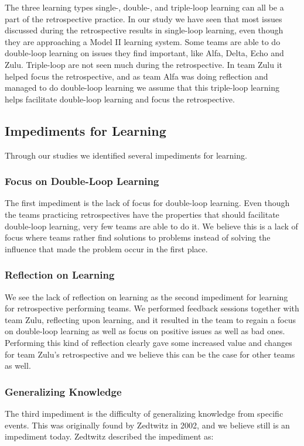 The three learning types single-, double-, and triple-loop learning can all be a part of the retrospective practice. In our study we have seen that most issues discussed during the retrospective results in single-loop learning, even though they are approaching a Model II learning system. Some teams are able to do double-loop learning on issues they find important, like Alfa, Delta, Echo and Zulu. Triple-loop are not seen much during the retrospective. In team Zulu it helped focus the retrospective, and as team Alfa was doing reflection and managed to do double-loop learning we assume that this triple-loop learning helps facilitate double-loop learning and focus the retrospective. 

\subsection{Impediments for Learning}
\label{discussion:learning-impediments}
Through our studies we identified several impediments for learning. 

\subsubsection{Focus on Double-Loop Learning}
The first impediment is the lack of focus for double-loop learning. Even though the teams practicing retrospectives have the properties that should facilitate double-loop learning, very few teams are able to do it. We believe this is a lack of focus where teams rather find solutions to problems instead of solving the influence that made the problem occur in the first place.

\subsubsection{Reflection on Learning}
We see the lack of reflection on learning as the second impediment for learning for retrospective performing teams. We performed feedback sessions together with team Zulu, reflecting upon learning, and it resulted in the team to regain a focus on double-loop learning as well as focus on positive issues as well as bad ones. Performing this kind of reflection clearly gave some increased value and changes for team Zulu's retrospective and we believe this can be the case for other teams as well. 

\subsubsection{Generalizing Knowledge}
The third impediment is the difficulty of generalizing knowledge from specific events. This was originally found by Zedtwitz \cite{Zedtwitz2002} in 2002, and we believe still is an impediment today. Zedtwitz described the impediment as: 

